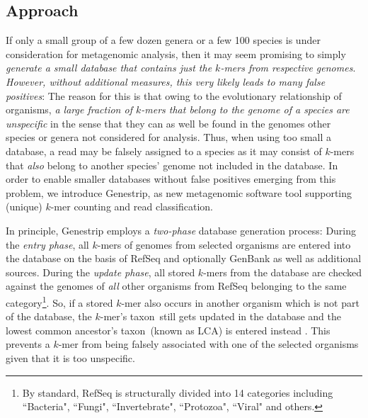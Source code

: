 \documentclass[pdflatex,sn-vancouver-num]{sn-jnl}
\newcommand{\taxon}{taxon}
\begin{document}
    
    

    \subsection{Approach}
    \label{approach}

    If only a small group of a few dozen genera or a few 100 species is under consideration for metagenomic analysis, then it may seem promising to simply \emph{generate a small database that contains just the $k$-mers from respective genomes}. \emph{However, without additional measures, this very likely leads to many false positives}: The reason for this is that owing to the evolutionary relationship of organisms, \emph{a large fraction of $k$-mers that belong to the genome of a species are unspecific} in the sense that they can as well be found in the genomes other species or genera not considered for analysis. Thus, when using too small a database, a read may be falsely assigned to a species as it may consist of $k$-mers that \emph{also} belong to another species' genome not included in the database.
In order to enable smaller databases without false positives emerging from this problem, we introduce Genestrip, as new metagenomic software tool supporting (unique) $k$-mer counting and read classification.

    In principle, Genestrip employs a \emph{two-phase} database generation process: During the \emph{entry phase}, all $k$-mers of genomes from selected organisms are entered into the database on the basis of RefSeq \citep{refseq} and optionally GenBank \citep{genbank} as well as additional sources. During the \emph{update phase}, all stored $k$-mers from the database are checked against the genomes of \emph{all} other organisms from RefSeq belonging to the same category\footnote{By standard, RefSeq is structurally divided into 14 categories including ``Bacteria", ``Fungi", ``Invertebrate", ``Protozoa", ``Viral" and others.}. So, if a stored $k$-mer also occurs in another organism which is not part of the database, the $k$-mer's \taxon\ still gets updated in the database and the lowest common ancestor's \taxon\ (known as LCA) is entered instead \citep{Nasko:2018aa}. This prevents a $k$-mer from being falsely associated with one of the selected organisms given that it is too unspecific.
\end{document}
